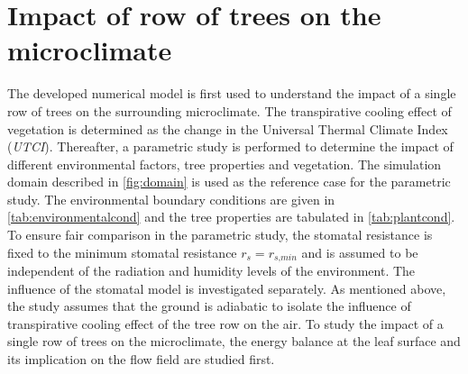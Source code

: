 

\section{Impact of row of trees on the microclimate}

The developed numerical model is first used to understand the impact of a single row of trees on the surrounding microclimate. The transpirative cooling effect of vegetation is determined as the change in the Universal Thermal Climate Index (\textit{UTCI}). Thereafter, a parametric study is performed to determine the impact of different environmental factors, tree properties and vegetation. The simulation domain described in \cref{fig:domain} is used as the reference case for the parametric study. The environmental boundary conditions are given in \cref{tab:environmentalcond} and the tree properties are tabulated in \cref{tab:plantcond}. To ensure fair comparison in the parametric study, the stomatal resistance is fixed to the minimum stomatal resistance $r_s=r_{\textit{s,min}}$ and is assumed to be independent of the radiation and humidity levels of the environment. The influence of the stomatal model is investigated separately. As mentioned above, the study assumes that the ground is adiabatic to isolate the influence of transpirative cooling effect of the tree row on the air. To study the impact of a single row of trees on the microclimate, the energy balance at the leaf surface and its implication on the flow field are studied first.

